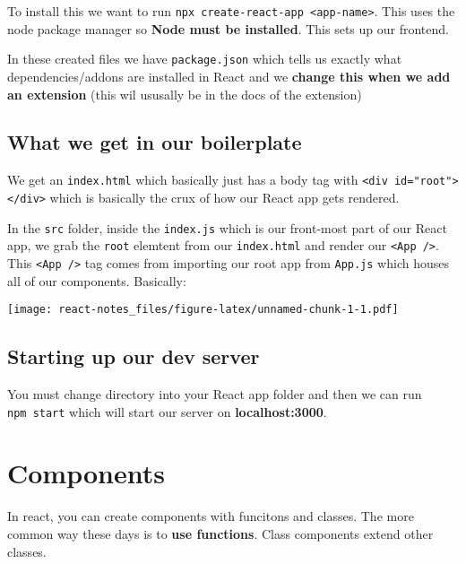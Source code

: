 \documentclass[
]{report}
\theoremstyle{definition}
\theoremstyle{definition}
\theoremstyle{definition}
\theoremstyle{definition}
\theoremstyle{remark}
\begin{document}
To install this we want to run \texttt{npx\ create-react-app\ \textless{}app-name\textgreater{}}. This uses the node package manager so \textbf{Node must be installed}. This sets up our frontend.

In these created files we have \texttt{package.json} which tells us exactly what dependencies/addons are installed in React and we \textbf{change this when we add an extension} (this wil ususally be in the docs of the extension)

\hypertarget{what-we-get-in-our-boilerplate}{%
\subsection{What we get in our boilerplate}\label{what-we-get-in-our-boilerplate}}

We get an \texttt{index.html} which basically just has a body tag with \texttt{\textless{}div\ id="root"\textgreater{}\textless{}/div\textgreater{}} which is basically the crux of how our React app gets rendered.

In the \texttt{src} folder, inside the \texttt{index.js} which is our front-most part of our React app, we grab the \texttt{root} elemtent from our \texttt{index.html} and render our \texttt{\textless{}App\ /\textgreater{}}. This \texttt{\textless{}App\ /\textgreater{}} tag comes from importing our root app from \texttt{App.js} which houses all of our components. Basically:

\texttt{[image: react-notes\_files/figure-latex/unnamed-chunk-1-1.pdf]}

\hypertarget{starting-up-our-dev-server}{%
\subsection{Starting up our dev server}\label{starting-up-our-dev-server}}

You must change directory into your React app folder and then we can run \texttt{npm\ start} which will start our server on \textbf{localhost:3000}.

\hypertarget{components}{%
\section{Components}\label{components}}

In react, you can create components with funcitons and classes. The more common
way these days is to \textbf{use functions}. Class components extend other classes.
\end{document}
